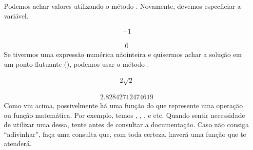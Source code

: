 \documentclass[letterpaper,10pt,english]{jupyterBook}
\begin{document}
\sphinxAtStartPar
Podemos achar valores utilizando o método . Novamente, devemos especficiar a variável.

\begin{sphinxVerbatim}[commandchars=\\\{\}]
 
\end{sphinxVerbatim}
\begin{equation*}
\begin{split}\displaystyle -1\end{split}
\end{equation*}
\begin{sphinxVerbatim}[commandchars=\\\{\}]
\end{sphinxVerbatim}
\begin{equation*}
\begin{split}\displaystyle 0\end{split}
\end{equation*}
\sphinxAtStartPar
Se tivermos uma expressão numérica não\sphinxhyphen{}inteira e quisermos achar a solução em um ponto flutuante (), podemos usar o método .

\begin{sphinxVerbatim}[commandchars=\\\{\}]
  
\end{sphinxVerbatim}
\begin{equation*}
\begin{split}\displaystyle 2 \sqrt{2}\end{split}
\end{equation*}
\begin{sphinxVerbatim}[commandchars=\\\{\}]
\end{sphinxVerbatim}
\begin{equation*}
\begin{split}\displaystyle 2.82842712474619\end{split}
\end{equation*}
\sphinxAtStartPar
Como viu acima, possivelmente há uma função do  que represente uma operação ou função matemática. Por exemplo, temos , , ,  e etc. Quando sentir necessidade de utilizar uma dessa, tente antes de consultar a documentação. Caso não consiga “adivinhar”, faça uma consulta que, com toda certeza, haverá uma função que te atenderá.
\end{document}
